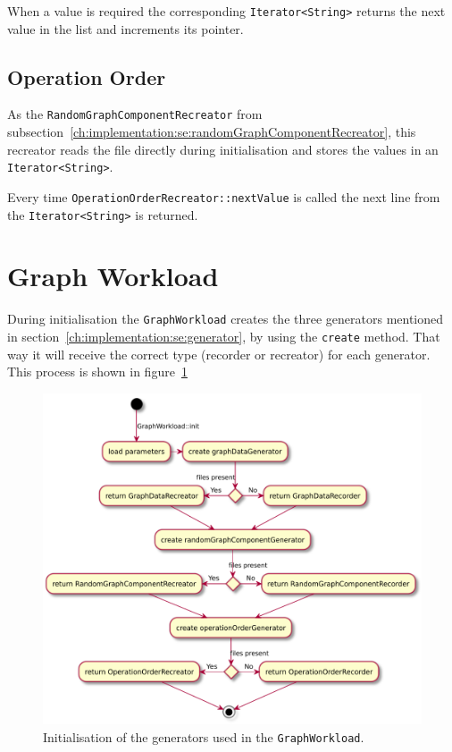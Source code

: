 When a value is required the corresponding \texttt{Iterator<String>} returns the next value in the list and increments its pointer.

\subsection{Operation Order}
As the \texttt{RandomGraphComponentRecreator} from subsection~\ref{ch:implementation:se:randomGraphComponentRecreator},
this recreator reads the file directly during initialisation and stores the values in an \texttt{Iterator<String>}.

Every time \texttt{OperationOrderRecreator::nextValue} is called the next line from the \texttt{Iterator<String>} is returned.

\section{Graph Workload}
\label{ch:implementation:se:graphWorkload}
During initialisation the \texttt{GraphWorkload} creates the three generators mentioned in section~\ref{ch:implementation:se:generator},
by using the \texttt{create} method.
That way it will receive the correct type (recorder or recreator) for each generator.
This process is shown in figure~\ref{fig:graphWorkloadInit}

\begin{figure}[h!]
  \includegraphics[width=\textwidth]{images/extensions/GraphWorkload}
  \caption{Initialisation of the generators used in the \texttt{GraphWorkload}.}
  \label{fig:graphWorkloadInit}
\end{figure}

